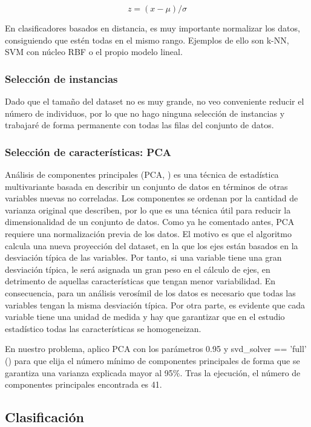 $$ z = (x-\mu)/\sigma $$ 


En clasificadores basados en distancia, es muy importante normalizar los datos, consiguiendo que estén todas en el mismo rango. Ejemplos de ello son k-NN, SVM con núcleo RBF o el propio modelo lineal.

\subsubsection{Selección de instancias}

Dado que el tamaño del dataset no es muy grande, no veo conveniente reducir el número de individuos, por lo que no hago ninguna selección de instancias y trabajaré de forma permanente con todas las filas del conjunto de datos.

\subsubsection{Selección de características: PCA}

Análisis de componentes principales (PCA, \cite{pca}) es una técnica de estadística multivariante basada en describir un conjunto de datos en términos de otras variables nuevas no correladas. Los componentes se ordenan por la cantidad de varianza original que describen, por lo que es una técnica útil para reducir la dimensionalidad de un conjunto de datos. Como ya he comentado antes, PCA requiere una normalización previa de los datos. El motivo es que el algoritmo calcula una nueva proyección del dataset, en la que los ejes están basados en la desviación típica de las variables. Por tanto, si una variable tiene una gran desviación típica, le será asignada un gran peso en el cálculo de ejes, en detrimento de aquellas características que tengan menor variabilidad. En consecuencia, para un análisis verosímil de los datos es necesario que todas las variables tengan la misma desviación típica. Por otra parte, es evidente que cada variable tiene una unidad de medida y hay que garantizar que en el estudio estadístico todas las características se homogeneizan. 

En nuestro problema, aplico PCA con los parámetros 0.95 y svd\_solver == 'full' (\cite{pca-sk}) para que elija el número mínimo de componentes principales de forma que se garantiza una varianza explicada mayor al 95\%. Tras la ejecución, el número de componentes principales encontrada es 41.

\subsection{Clasificación}


